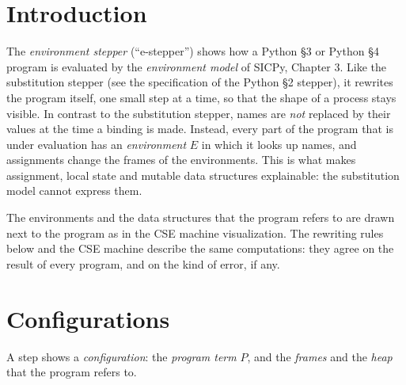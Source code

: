 

\newcommand{\sEnv}{E}
\newcommand{\sRef}[1]{\sCode{\#}#1}
\newcommand{\sBlock}[2]{[\![\,#1,\ #2\,]\!]}
\newcommand{\sStep}[4]{#1 \vdash #2 \Rightarrow #3 \quad\textnormal{\emph{changing:}}\ #4}
\newcommand{\sPure}[3]{#1 \vdash #2 \Rightarrow #3}
\newcommand{\sNew}[2]{\mathbf{new}\ \sRef{#1} = #2}
\newcommand{\sUn}{\bot}

\section*{Introduction}

The \emph{environment stepper} (``e-stepper'') shows how a Python \S 3 or
Python \S 4 program is evaluated by the \emph{environment model} of SICPy,
Chapter 3. Like the substitution stepper (see the specification of the
Python \S 2 stepper), it rewrites the program itself, one small step at a
time, so that the shape of a process stays visible. In contrast to the
substitution stepper, names are \emph{not} replaced by their values at the time
a binding is made. Instead, every part of the program that is under evaluation
has an \emph{environment} $\sEnv$ in which it looks up names, and assignments
change the frames of the environments. This is what makes assignment, local
state and mutable data structures explainable: the substitution model cannot
express them.

The environments and the data structures that the program refers to are
drawn next to the program as in the CSE machine visualization. The
rewriting rules below and the CSE machine describe the same computations: they
agree on the result of every program, and on the kind of error, if any.

\section*{Configurations}

A step shows a \emph{configuration}: the \emph{program term} $P$, and the
\emph{frames} and the \emph{heap} that the program refers to.

